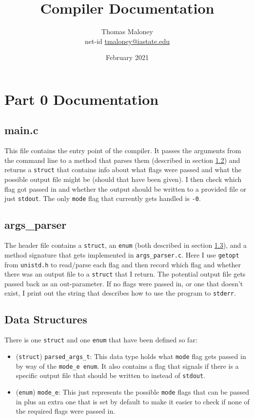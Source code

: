 \documentclass{article}
\title{Compiler Documentation}
\author{Thomas Maloney \\ 
net-id \href{mailto:tmaloney@iastate.edu}{tmaloney@iastate.edu}}
\date{February 2021}
\begin{document}
\maketitle

\newcommand{\code}[1]{\texttt{#1}}

\section{Part 0 Documentation}
\subsection{main.c} \label{ssec:p0main}
This file contains the entry point of the compiler.
It passes the arguments from the command line to a method that parses them (described in section \ref{ssec:p0argparser}) and returns a \code{struct} that contains info about what flags were passed and what the possible output file might be (should that have been given).
I then check which flag got passed in and whether the output should be written to a provided file or just \code{stdout}.
The only \code{mode} flag that currently gets handled is \code{-0}.

\subsection{args\_parser} \label{ssec:p0argparser}
The header file contains a \code{struct}, an \code{enum} (both described in section \ref{ssec:p0datastructs}), and a method signature that gets implemented in \code{args\_parser.c}.
Here I use \code{getopt} from \code{unistd.h} to read/parse each flag and then record which flag and whether there was an output file to a \code{struct} that I return.
The potential output file gets passed back as an out-parameter.
If no flags were passed in, or one that doesn't exist, I print out the string that describes how to use the program to \code{stderr}.

\subsection{Data Structures} \label{ssec:p0datastructs}
There is one \code{struct} and one \code{enum} that have been defined so far:
\begin{itemize}
    \item (\code{struct}) \code{parsed\_args\_t}: This data type holds what \code{mode} flag gets passed in by way of the \code{mode\_e enum}.
    It also contains a flag that signals if there is a specific output file that should be written to instead of \code{stdout}.
    \item (\code{enum}) \code{mode\_e}: This just represents the possible \code{mode} flags that can be passed in plus an extra one that is set by default to make it easier to check if none of the required flags were passed in.
\end{itemize}
\end{document}
